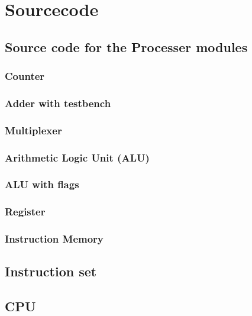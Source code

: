 \documentclass[12pt,a4paper]{article}
\begin{document}
\section{Sourcecode}

\subsection{Source code for the Processer modules}
	\subsubsection{Counter}
			
	\subsubsection{Adder with testbench}
			
	\subsubsection{Multiplexer}
			
	\subsubsection{Arithmetic Logic Unit (ALU)}
		
	\subsubsection{ALU with flags}
			
	\subsubsection{Register}
			
	\subsubsection{Instruction Memory}
			
\subsection{Instruction set}
		
\subsection{CPU}
	
\end{document}
